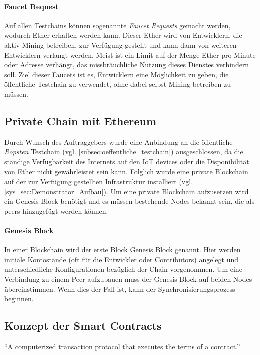 \paragraph{Faucet Request}
\label{para:Faucet_Request}
Auf allen Testchains können sogenannte \emph{Faucet Requests} gemacht werden, wodurch Ether erhalten werden kann. Dieser Ether wird von Entwicklern, die aktiv Mining betreiben, zur Verfügung gestellt und kann dann von weiteren Entwicklern verlangt werden. Meist ist ein Limit auf der Menge Ether pro Minute oder Adresse verhängt, das missbräuchliche Nutzung dieses Dienstes verhindern soll. Ziel dieser Faucets ist es, Entwicklern eine Möglichkeit zu geben, die öffentliche Testchain zu verwendet, ohne dabei selbst Mining betreiben zu müssen.\cite{blog.b9lab.com/faucet,ethereum.stackexchange.com/faucets}

\subsection{Private Chain mit Ethereum}
\label{subsec:private_chain}
Durch Wunsch des Auftraggebers wurde eine Anbindung an die öffentliche \emph{Ropsten} Testchain (vgl. \ref{subsec:oeffentliche_testchain}) ausgeschlossen, da die ständige Verfügbarkeit des Internets auf den IoT devices oder die Disponibilität von Ether nicht gewährleistet sein kann. Folglich wurde eine private Blockchain auf der zur Verfügung gestellten Infrastruktur installiert (vgl. \ref{sys_sec:Demonstrator_Aufbau}). Um eine private Blockchain aufzusetzen wird ein Genesis Block benötigt und es müssen bestehende Nodes bekannt sein, die als peers hinzugefügt werden können.

\paragraph{Genesis Block}
In einer Blockchain wird der erste Block Genesis Block genannt. Hier werden initiale Kontostände (oft für die Entwickler oder Contributors) angelegt und unterschiedliche Konfigurationen bezüglich der Chain vorgenommen.
Um eine Verbindung zu einem Peer aufzubauen muss der Genesis Block auf beiden Nodes übereinstimmen. Wenn dies der Fall ist, kann der Synchronisierungsprozess beginnen.

\subsection{Konzept der Smart Contracts}
\label{subsec:Recherche_Smart_Contracts}
``A computerized transaction protocol that executes the terms of a contract.''\cite{BlockchainRevolution}

